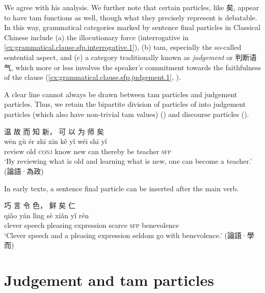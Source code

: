 \documentclass[UTF8, a4paper, oneside, scheme=plain, 12pt]{ctexrep}
\newcommand{\translate}[1]{`#1'}
\newcommand*{\category}[1]{\textsc{#1}}
\begin{document}
We agree with his analysis. We further note that certain particles, like 矣, appear to have \ac{tam} functions as well,
though what they precisely represent is debatable.
In this way, grammatical categories marked by sentence final particles in Classical Chinese include (a) the illocutionary force (interrogative in \ref{ex:grammatical.clause.sfp.interrogative.1}),
(b) \ac{tam}, especially the so-called sentential aspect, and
(c) a category traditionally known as \emph{judgement} or 判断语气, which more or less involves the speaker's commitment towards the faithfulness of the clause (\ref{ex:grammatical.clause.sfp.judgement.1}, ).

A clear line cannot always be drawn between \ac{tam} particles and judgement particles.
Thus, we retain the bipartite division of particles of \citet{li2004grammar} into judgement particles (which also have non-trivial \ac{tam} values) () and discourse particles ().


\begin{exe}    
    \ex\label{ex:grammatical.clause.sfp.aspectual.1}
    \glll 温 故 而 知 新， 可 以 为 师 矣 \\
    wēn gù ér zhī xīn kě yǐ wéi shī yǐ \\
    review old \category{conj} know new can thereby be teacher \category{sfp} \\
    \glt\translate{By reviewing what is old and learning what is new, one can become a teacher.} \hfill (論語·為政)
\end{exe}




In early texts, a sentence final particle can be inserted after the main verb.

\begin{exe}
    \ex
    \glll 巧 言 令 色， 鲜 矣 仁 \\
    qiǎo yán lìng sè xiǎn yǐ rén \\
    clever speech pleasing expression scarce \category{sfp} benevolence \\
    \glt\translate{Clever speech and a pleasing expression seldom go with benevolence.} \hfill (論語·學而)
\end{exe}

\section{Judgement and \ac{tam} particles}\label{sec:sfp.judgement}
\end{document}
